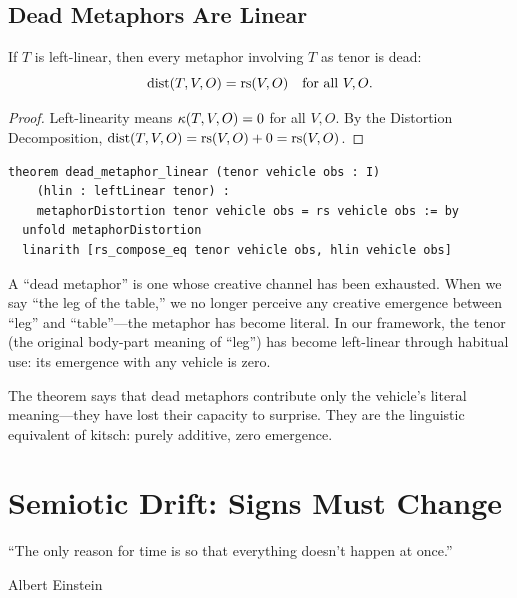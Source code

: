 \section{Dead Metaphors Are Linear}

\begin{theorem}
\label{thm:dead-metaphor}
If $T$ is left-linear, then every metaphor involving $T$ as tenor
is dead:
\[
  \mathrm{dist}(T, V, O) = \mathrm{rs}(V, O) \quad \text{for all } V, O.
\]
\end{theorem}

\begin{proof}
Left-linearity means $\kappa(T, V, O) = 0$ for all $V, O$.
By the Distortion Decomposition, $\mathrm{dist}(T, V, O) = \mathrm{rs}(V, O) + 0 = \mathrm{rs}(V, O)$.
\end{proof}

\begin{lstlisting}
theorem dead_metaphor_linear (tenor vehicle obs : I)
    (hlin : leftLinear tenor) :
    metaphorDistortion tenor vehicle obs = rs vehicle obs := by
  unfold metaphorDistortion
  linarith [rs_compose_eq tenor vehicle obs, hlin vehicle obs]
\end{lstlisting}

\begin{interpretation}
A ``dead metaphor'' is one whose creative channel has been exhausted.
When we say ``the leg of the table,'' we no longer perceive any creative
emergence between ``leg'' and ``table''---the metaphor has become literal.
In our framework, the tenor (the original body-part meaning of ``leg'')
has become left-linear through habitual use: its emergence with any
vehicle is zero.

The theorem says that dead metaphors contribute only the vehicle's
literal meaning---they have lost their capacity to surprise.  They are
the linguistic equivalent of kitsch: purely additive, zero emergence.
\end{interpretation}



\chapter{Semiotic Drift: Signs Must Change}
\label{ch:drift}

\epigraph{``The only reason for time is so that everything doesn't
happen at once.''}{Albert Einstein}

